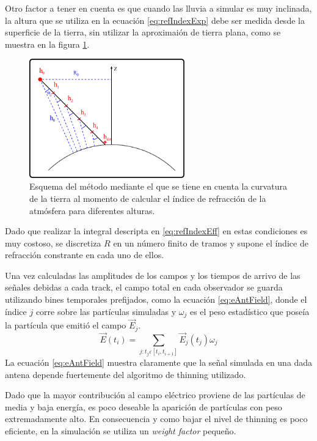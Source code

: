 	Otro factor a tener en cuenta es que cuando las lluvia a simular es muy inclinada, la altura que se utiliza en la ecuaci\'on \ref{eq:refIndexExp} debe ser medida desde la superficie de la tierra, sin utilizar la aproximai\'on de tierra plana, como se muestra en la figura \ref{fig:refIndex}.
	\begin{figure}[ht!]
	\centering
		\includegraphics[width=0.6\textwidth]{fig/simulacionRadio/refIndex}
		\caption{\label{fig:refIndex} Esquema del m\'etodo mediante el que se tiene en cuenta la curvatura de la tierra al momento de calcular el \'indice de refracci\'on de la atm\'osfera para diferentes alturas.}
	\end{figure}
	Dado que realizar la integral descripta en \ref{eq:refIndexEff} en estas condiciones es muy costoso, se discretiza $R$ en un n\'umero finito de tramos y supone el \'indice de refracci\'on constrante en cada uno de ellos.
	
	Una vez calculadas las amplitudes de los campos y los tiempos de arrivo de las se\~nales debidas a cada track, el campo total en cada observador se guarda utilizando bines temporales prefijados, como la ecuaci\'on \ref{eq:eAntField}, donde el \'indice $j$ corre sobre las part\'iculas simuladas y $\omega_j$ es el peso estad\'istico que pose\'ia la part\'icula que emiti\'o el campo $\vec{E}_j$.
	\begin{equation}
	\vec{E}(t_i)=\sum_{j:t_j\varepsilon[t_i,t_{i+1}]}\vec{E}_j(t_j)\omega_j
	\label{eq:eAntField}
	\end{equation}
	La ecuaci\'on \ref{eq:eAntField} muestra claramente que la se\~nal simulada en una dada antena depende fuertemente del algoritmo de thinning utilizado. 
	
	Dado que la mayor contribuci\'on al campo el\'ectrico proviene de las part\'iculas de media y baja energ\'ia, es poco deseable la aparici\'on de partículas con peso extremadamente alto.
	En consecuencia y como bajar el nivel de thinning es poco eficiente, en la simulación se utiliza un \emph{weight factor} peque\~no.

